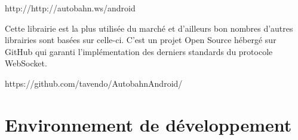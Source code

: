 \documentclass[a4paper, 12pt, svgnames]{report}
\begin{document}
\medskip

http://http://autobahn.ws/android

Cette librairie est la plus utilisée du marché et d'ailleurs bon nombres d'autres librairies sont basées sur celle-ci. C'est un projet Open Source hébergé sur GitHub qui garanti l'implémentation des derniers standards du protocole WebSocket.

https://github.com/tavendo/AutobahnAndroid/
	\chapter{Environnement de développement}
	
	
	
	
	
	
%	
%	
%
%	
%
%	
%	
%
%	
%	
%	
%	
%	
%	
%	
%	
%	
%
%	
%
%	
%	
	
%	
	
%	
%	
%	
%	
%	
%	
%	
%	
	\renewcommand*{\listfigurename}{Liste des figures}
	\listoffigures
	\clearpage
  	\listoftables
	\clearpage
	\renewcommand*{\lstlistlistingname}{Liste des codes}
  	\lstlistoflistings
	\clearpage
	\appendix	
	
\end{document}
